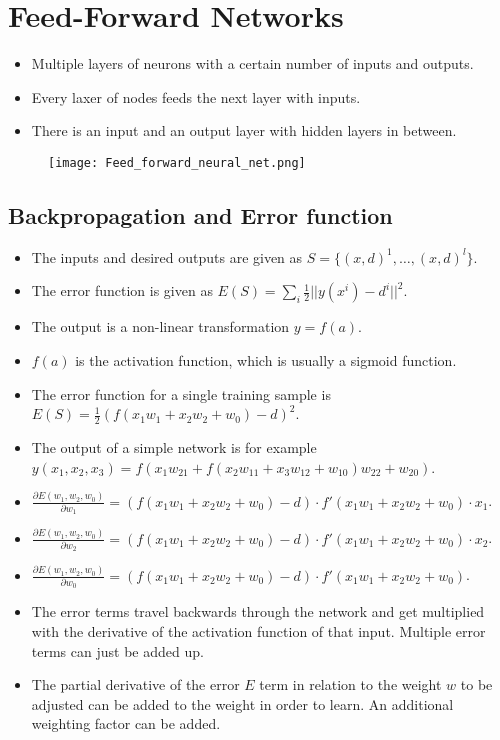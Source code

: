 \documentclass[main]{subfiles}
\begin{document}

\section{Feed-Forward Networks}
\begin{itemize}[noitemsep,nolistsep]
	\item Multiple layers of neurons with a certain number of inputs and outputs.
	\item Every laxer of nodes feeds the next layer with inputs.
	\item There is an input and an output layer with hidden layers in between.
\end{itemize}
\begin{figure}[H]
	\texttt{[image: Feed\_forward\_neural\_net.png]}
\end{figure}

\subsection{Backpropagation and Error function}
\begin{itemize}[noitemsep,nolistsep]
	\item The inputs and desired outputs are given as $S=\{(x,d)^1,\ldots,(x,d)^l\}$.
	\item The error function is given as $E(S) = \sum_i\frac{1}{2}||y(x^i)-d^i||^2$.
	\item The output is a non-linear transformation $y=f(a)$.
	\item $f(a)$ is the activation function, which is usually a sigmoid function.
	\item The error function for a single training sample is $E(S)=\frac{1}{2}(f(x_1w_1+x_2w_2+w_0)-d)^2$.
	\item The output of a simple network is for example $y(x_1,x_2,x_3)=f(x_1w_{21}+f(x_2w_{11}+x_3w_{12}+w_{10})w_{22}+w_{20})$.
	\item $\frac{\partial E(w_1,w_2,w_0)}{\partial w_1}=(f(x_1w_1+x_2w_2+w_0)-d)\cdot f'(x_1w_1+x_2w_2+w_0)\cdot x_1$.
	\item $\frac{\partial E(w_1,w_2,w_0)}{\partial w_2}=(f(x_1w_1+x_2w_2+w_0)-d)\cdot f'(x_1w_1+x_2w_2+w_0)\cdot x_2$.
	\item $\frac{\partial E(w_1,w_2,w_0)}{\partial w_0}=(f(x_1w_1+x_2w_2+w_0)-d)\cdot f'(x_1w_1+x_2w_2+w_0)$.
	\item The error terms travel backwards through the network and get multiplied with the derivative of the activation function of that input. Multiple error terms can just be added up.
	\item The partial derivative of the error $E$ term in relation to the weight $w$ to be adjusted can be added to the weight in order to learn. An additional weighting factor can be added.
\end{itemize}
\end{document}
